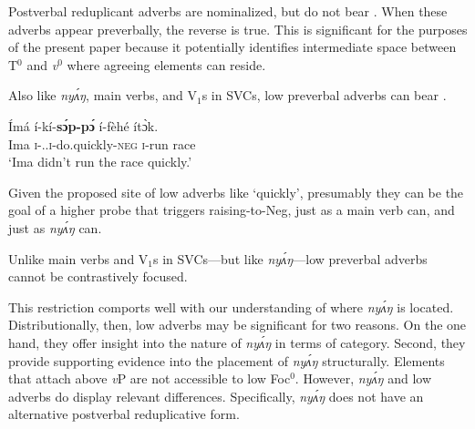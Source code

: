 \documentclass[output=paper,modfonts,nonflat,
]{langsci/langscibook}
\begin{document}
\ea\label{ex:duncan-et-al:18}
\z
\z

\noindent Postverbal reduplicant adverbs are nominalized, but do not bear . When these adverbs appear preverbally, the reverse is true. This is significant for the purposes of the present paper because it potentially identifies intermediate space between T$^0$ and \textit{v}$^0$ where  agreeing elements can reside.

Also like \textit{ny\'{ʌ}ŋ}, main verbs, and V$_1$s in SVCs, low preverbal adverbs can bear .

\ea\label{ex:duncan-et-al:19}
\gll \'{I}má í-kí-\textbf{s\'ɔp-p\'ɔ} í-f\`{e}hé ít\`ɔk. \\
Ima \textsc{i}-{\PST.\FOC}.\textsc{i}-do.quickly-\textsc{neg} \textsc{i}-run race \\
\glt `Ima didn't run the race quickly.'
\z

\noindent Given the proposed site of low adverbs like `quickly', presumably they can be the goal of a higher probe that triggers raising-to-Neg, just as a main verb can, and just as \textit{ny\'{ʌ}ŋ} can. 

Unlike main verbs and V$_1$s in SVCs---but like \textit{ny\'{ʌ}ŋ}---low preverbal adverbs cannot be contrastively focused.

\label{ex:duncan-et-al:20}
\z

\noindent This restriction comports well with our understanding of where \textit{ny\'{ʌ}ŋ} is located. Distributionally, then, low adverbs may be significant for two reasons. On the one hand, they offer insight into the nature of \textit{ny\'{ʌ}ŋ} in terms of category. Second, they provide supporting evidence into the placement of \textit{ny\'{ʌ}ŋ} structurally. Elements that attach above \textit{v}P are not accessible to low Foc$^0$. However, \textit{ny\'{ʌ}ŋ} and low adverbs do display relevant differences. Specifically, \textit{ny\'{ʌ}ŋ} does not have an alternative postverbal reduplicative form.
\end{document}
